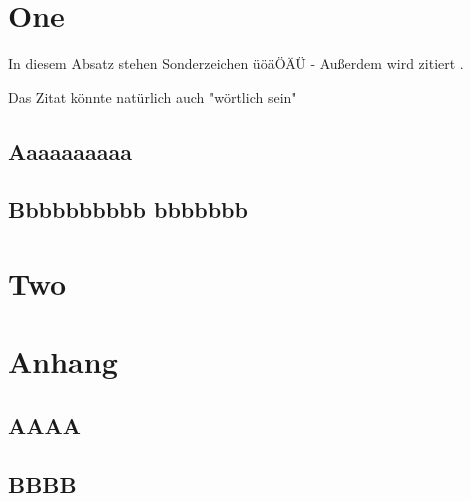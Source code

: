 \chapter{One}

\par In diesem Absatz stehen Sonderzeichen üöäÖÄÜ - Außerdem wird zitiert \citep[vgl.][S. 3]{McAfee.2006}.
\par Das Zitat könnte natürlich auch "wörtlich sein" \citep[S. 2]{McAfee.2006}	

\section{Aaaaaaaaaa}
\lipsum
\section{Bbbbbbbbbb bbbbbbb}
\lipsum
\chapter{Two}
\appendix
\chapter{Anhang}
\section{AAAA}
\section{BBBB}